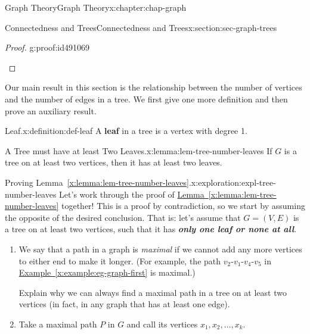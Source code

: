 \documentclass[oneside,10pt,]{book}
\newcommand{\xreffont}{\relax}
\newcommand{\alert}[1]{\textbf{\textit{#1}}}
\newcommand{\terminology}[1]{\textbf{#1}}
\numberwithin{equation}{section}
\begin{document}
\begin{chapterptx}{Graph Theory}{}{Graph Theory}{}{}{x:chapter:chap-graph}
\begin{sectionptx}{Connectedness and Trees}{}{Connectedness and Trees}{}{}{x:section:sec-graph-trees}
\begin{proof}{}{g:proof:id491069}
\begin{sidebyside}{2}{0}{0}{0.07}
\begin{sbspanel}{0.18}
{
}%
\end{sbspanel}%
\end{sidebyside}%
\end{proof}
Our main result in this section is the relationship between the number of vertices and the number of edges in a tree. We first give one more definition and then prove an auxiliary result.%
\begin{definition}{Leaf.}{x:definition:def-leaf}%
A \terminology{leaf} in a tree is a vertex with degree 1.%
\end{definition}
\begin{lemma}{A Tree must have at least Two Leaves.}{}{x:lemma:lem-tree-number-leaves}%
If \(G\) is a tree on at least two vertices, then it has at least two leaves.%
\end{lemma}
\begin{exploration}{Proving Lemma~{\xreffont\ref*{x:lemma:lem-tree-number-leaves}}.}{x:exploration:expl-tree-number-leaves}%
Let's work through the proof of \hyperref[x:lemma:lem-tree-number-leaves]{Lemma~{\xreffont\ref{x:lemma:lem-tree-number-leaves}}} together! This is a proof by contradiction, so we start by assuming the opposite of the desired conclusion. That is: let's assume that \(G = (V,E)\) is a tree on at least two vertices, such that it has \alert{only one leaf or none at all}.%
\begin{enumerate}[font=\bfseries,label=(\alph*),ref=\alph*]
\item{}We say that a path in a graph is \emph{maximal} if we cannot add any more vertices to either end to make it longer. (For example, the path \(v_2\)-\(v_1\)-\(v_4\)-\(v_5\) in \hyperref[x:example:eg-graph-first]{Example~{\xreffont\ref{x:example:eg-graph-first}}} is maximal.)%
\par
Explain why we can always find a maximal path in a tree on at least two vertices (in fact, in any graph that has at least one edge).%
\item{}Take a maximal path \(P\) in \(G\) and call its vertices \(x_1,x_2,\ldots,x_k\).%
\begin{sidebyside}{1}{0.3}{0.3}{0}%

\end{sidebyside}
\end{enumerate}
\end{exploration}
\end{sectionptx}
\end{chapterptx}
\end{document}
